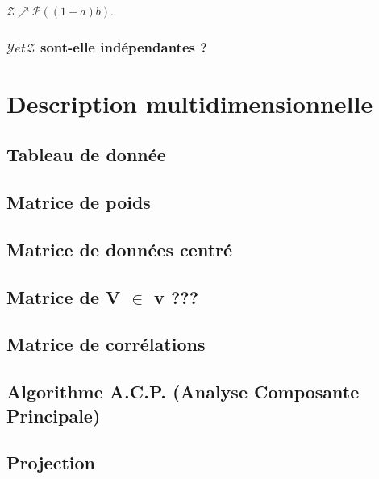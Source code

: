 \documentclass[a4paper, 12pt]{article}
\begin{document}
$\mathcal{Z} \nearrow \mathcal{P} ((1 - a)b)$.


\subsubsection{$\mathcal{Y} et \mathcal{Z}$ sont-elle indépendantes ?}


\section{Description multidimensionnelle}

\subsection{Tableau de donnée}
\subsection{Matrice de poids}
\subsection{Matrice de données centré}
\subsection{Matrice de V $\in$ v ???}
\subsection{Matrice de corrélations}
\subsection{Algorithme A.C.P. (Analyse Composante Principale)}
\subsection{Projection}
\end{document}
